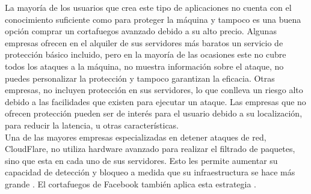 La mayoría de los usuarios que crea este tipo de aplicaciones no cuenta con el conocimiento suficiente como para proteger la máquina y tampoco es una buena opción comprar un cortafuegos avanzado debido a su alto precio. Algunas empresas ofrecen en el alquiler de sus servidores más baratos un servicio de protección básico incluido, pero en la mayoría de las ocasiones este no cubre todos los ataques a la máquina, no muestra información sobre el ataque, no puedes personalizar la protección y tampoco garantizan la eficacia. Otras empresas, no incluyen protección en sus servidores, lo que conlleva un riesgo alto debido a las facilidades que existen para ejecutar un ataque. Las empresas que no ofrecen protección pueden ser de interés para el usuario debido a su localización, para reducir la latencia, u otras características.
\\Una de las mayores empresas especializadas en detener ataques de red, CloudFlare, no utiliza hardware avanzado para realizar el filtrado de paquetes, sino que esta en cada uno de sus servidores. Esto les permite aumentar su capacidad de detección y bloqueo a medida que su infraestructura se hace más grande \cite{mtvDDOSCLoudflare}. El cortafuegos de Facebook también aplica esta estrategia \cite{mtvDDOSFacebook}. 